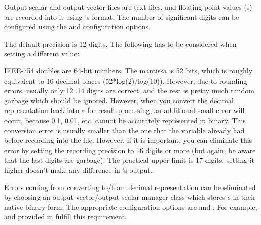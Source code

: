 Output scalar and output vector files are text files, and floating point
values (s) are recorded into it using 's
 format. The number of significant digits can be configured
using the  and 
configuration options.

The default precision is 12 digits. The following has to be considered when
setting a different value:

IEEE-754 doubles are 64-bit numbers. The mantissa is 52 bits, which is
roughly equivalent to 16 decimal places (52*log(2)/log(10)). However, due
to rounding errors, usually only 12..14 digits are correct, and the rest is
pretty much random garbage which should be ignored. However, when you
convert the decimal representation back into a  for result
processing, an additional small error will occur, because 0.1, 0.01, etc.
cannot be accurately represented in binary. This conversion error is
usually smaller than the one that the  variable already had
before recording into the file. However, if it is important, you can
eliminate this error by setting the recording precision to 16 digits or
more (but again, be aware that the last digits are garbage). The practical
upper limit is 17 digits, setting it higher doesn't make any difference in
's output.

%
%
%

Errors coming from converting to/from decimal representation can be
eliminated by choosing an output vector/output scalar manager class
which stores s in their native binary form.
The appropriate configuration options are 
and . For example,
 and 
provided in  fulfill this requirement.

